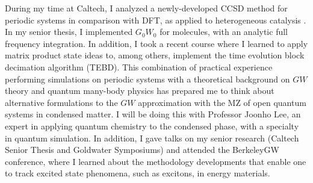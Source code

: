 During my time at Caltech, I analyzed a newly-developed CCSD method for periodic systems in comparison with DFT, as applied to heterogeneous catalysis \cite{kozlowski_elucidating_2021}. In my senior thesis, I implemented $G_0W_0$ for molecules, with an analytic full frequency integration. In addition, I took a recent course where I learned to apply matrix product state ideas to, among others, implement the time evolution block decimation algorithm (TEBD). This combination of practical experience performing simulations on periodic systems with a theoretical background on $GW$ theory and quantum many-body physics has prepared me to think about alternative formulations to the $GW$ approximation with the MZ of open quantum systems in condensed matter. I will be doing this with Professor Joonho Lee, an expert in applying quantum chemistry to the condensed phase, with a specialty in quantum simulation. In addition, I gave talks on my senior research (Caltech Senior Thesis and Goldwater Symposiums) and attended the BerkeleyGW conference, where I learned about the methodology developments that enable one to track excited state phenomena, such as excitons, in energy materials.